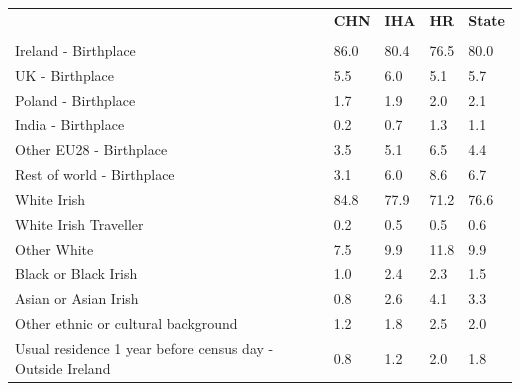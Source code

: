 \documentclass{article}
\begin{document}
\pagebreak
\begin{table}[h]	
\centering
		\begin{tabular}{KTTTT}
  \hline
& \textbf{CHN} & \textbf{IHA} & \textbf{HR}& \textbf{State}\\ 
  \hline
    \\ 
    \hline
Ireland - Birthplace & 86.0& 80.4& 76.5& 80.0\\
UK - Birthplace & 5.5& 6.0& 5.1& 5.7\\
Poland - Birthplace & 1.7& 1.9& 2.0& 2.1\\
India - Birthplace & 0.2& 0.7& 1.3& 1.1\\
Other EU28 - Birthplace & 3.5& 5.1& 6.5& 4.4\\
Rest of world - Birthplace & 3.1& 6.0& 8.6& 6.7\\
    \hline
White Irish & 84.8& 77.9& 71.2& 76.6\\
White Irish Traveller & 0.2& 0.5& 0.5& 0.6\\
Other White &  7.5&  9.9& 11.8&  9.9\\
Black or Black Irish & 1.0& 2.4& 2.3& 1.5\\
Asian or Asian Irish & 0.8& 2.6& 4.1& 3.3\\
Other ethnic or cultural background & 1.2& 1.8& 2.5& 2.0\\
    \hline
Usual residence 1 year before census day - Outside Ireland & 0.8& 1.2& 2.0& 1.8\\


\end{tabular}
\end{table}
\end{document}
